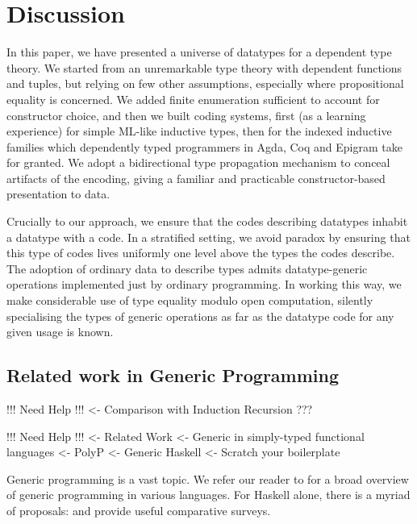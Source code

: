 \section{Discussion}


In this paper, we have presented a universe of datatypes for a
dependent type theory. We started from an unremarkable type theory
with dependent functions and tuples, but relying on few other
assumptions, especially where propositional equality is concerned.  We
added finite enumeration sufficient to account for constructor choice,
and then we built coding systems, first (as a learning experience) for
simple ML-like inductive types, then for the indexed inductive
families which dependently typed programmers in Agda, Coq and Epigram
take for granted. We adopt a bidirectional type propagation mechanism
to conceal artifacts of the encoding, giving a familiar and practicable
constructor-based presentation to data.

Crucially to our approach, we ensure that the codes describing
datatypes inhabit a datatype with a code. In a stratified setting, we
avoid paradox by ensuring that this type of codes lives uniformly one
level above the types the codes describe. The adoption of ordinary
data to describe types admits datatype-generic operations implemented
just by ordinary programming. In working this way, we make
considerable use of type equality modulo open computation, silently
specialising the types of generic operations as far as the datatype
code for any given usage is known.

\subsection{Related work in Generic Programming}

\begin{wstructure}
!!! Need Help !!!
<- Comparison with Induction Recursion
    ???
\end{wstructure}


\begin{wstructure}
!!! Need Help !!!
<- Related Work
    <- Generic in simply-typed functional languages
        <- PolyP \cite{jansson:polyp}
        <- Generic Haskell \cite{hinze:generic-haskell}
        <- Scratch your boilerplate \cite{spj:syb}
\end{wstructure}

Generic programming is a vast topic. We refer our reader to
\citet{garcia:generic-comparative-study} for a broad overview of
generic programming in various languages. For Haskell alone, there is
a myriad of proposals: 
\citet{hinze:generic-approach-comparative} and
\citet{rodriguez:generic-libs-comparative} provide useful comparative
surveys.

